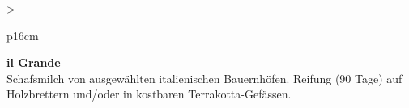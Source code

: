 \documentclass[
  beamerpaper,
  DIV=11,
  numbers=noendperiod,
  aspectratio=54]{scrreprt}
\begin{document}
\begin{table}

\caption{\label{tbl-panel-cheese}Pecorino}\begin{minipage}[t]{\linewidth}

\tabularnewline

\fontsize{16}{18}\selectfont
\begin{tabular}{>{\raggedright\arraybackslash}p{16cm}}
\toprule
\begingroup\fontsize{18}{20}\selectfont \textbf{il Grande}\endgroup\\
\midrule
Schafsmilch von ausgewählten italienischen Bauernhöfen. Reifung (90 Tage) auf Holzbrettern und/oder in kostbaren Terrakotta-Gefässen.\\
\bottomrule
\end{tabular}

\end{minipage}%
\newline
\begin{minipage}[t]{\linewidth}


\end{minipage}%

\end{table}

\break
\end{document}
